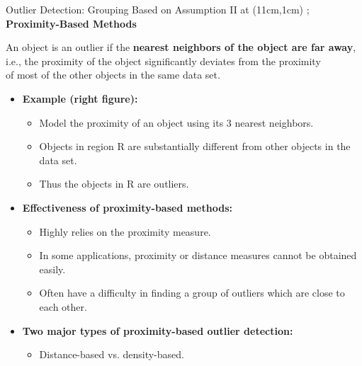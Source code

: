 \begin{frame}{Outlier Detection: Grouping Based on Assumption II}
	\tikzoverlay at (11cm,1cm) {};
	\textcolor{faugray}{\textbf{Proximity-Based Methods}}

	An object is an outlier if the \textbf{\color{airforceblue}nearest neighbors of the object are far away},\\ i.e., the proximity of the object significantly deviates from the proximity\\ of most of the other objects in the same data set.
	\begin{itemize}

		\item \textbf{Example (right figure):}
		      \begin{itemize}
			      \item Model the proximity of an object using its 3 nearest neighbors.
			      \item Objects in region R are substantially different from other objects in the data set.
			      \item Thus the objects in R are outliers.
		      \end{itemize}
		\item \textbf{Effectiveness of proximity-based methods:}
		      \begin{itemize}
			      \item Highly relies on the proximity measure.
			      \item In some applications, proximity or distance measures cannot be obtained easily.
			      \item Often have a difficulty in finding a group of outliers which are close to each other.
		      \end{itemize}
		\item \textbf{Two major types of proximity-based outlier detection:}
		      \begin{itemize}
			      \item Distance-based vs. density-based.
		      \end{itemize}
	\end{itemize}
\end{frame}


